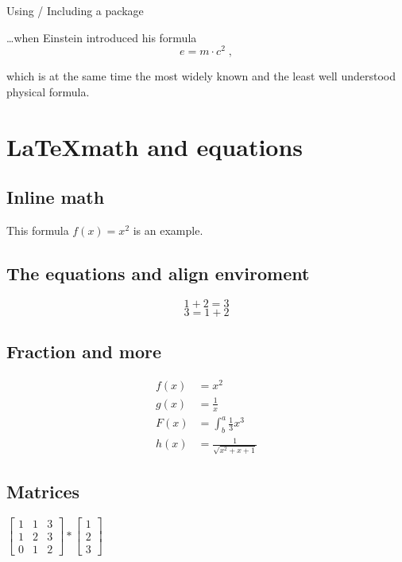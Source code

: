 \documentclass[%
  parskip=full,%
  twoside=false%
]{book}
\begin{document}
Using / Including a package

\ldots when Einstein introduced his formula
\begin{equation}
e = m \cdot c^2 \; ,
\end{equation}

which is at the same time the most widely known and the least well understood physical formula.

\chapter{\LaTeX math and equations}

\section{Inline math}

This formula $f(x) = x^2$ is an example.

\section{The equations and align enviroment}

\begin{equation}
  1 + 2 = 3
\end{equation}
\begin{equation}
  3 = 1 + 2
\end{equation}

\section{Fraction and more}


\begin{align*}
    f(x) &= x^2\\
    g(x) &= \frac{1}{x}\\
    F(x) &= \int^a_b \frac{1}{3} x^3\\
    h(x) &= \frac{1}{\sqrt{x^2 + x + 1}}
\end{align*}

\section{Matrices}

$
\left[
\begin{matrix}
  1 & 1 & 3\\
  1 & 2 & 3\\
  0 & 1 & 2
\end{matrix}
\right]
*
\left[
\begin{matrix}
  1\\
  2\\
  3
\end{matrix}
\right]
$
\end{document}
